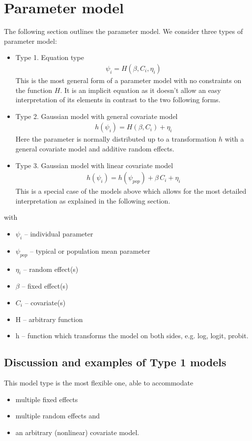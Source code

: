 \section{Parameter model}
\label{sec:parameterModel}
\label{maths:parameter_defn}
\label{maths:parameter-model}

The following section outlines the parameter model. We consider three types of parameter model:
\begin{itemize}
\item
Type 1. Equation type
\begin{align*}
\psi_i = H(\beta, C_i, \eta_i)
\end{align*}
This is the most general form of a parameter model with no constraints on the function $H$.
It is an implicit equation as it doesn't allow an easy interpretation of its elements in contrast to the two following forms.
\item
Type 2. Gaussian model with general covariate model
\begin{align*}
h(\psi_i) = H(\beta, C_i) + \eta_i
\end{align*}
Here the parameter is normally distributed up to a transformation $h$ with a general covariate model and additive random effects.
\item
Type 3. Gaussian model with linear covariate model
\begin{align*}
h(\psi_i) = h(\psi_{pop}) + \beta \, C_i + \eta_i
\end{align*}
This is a special case of the models above which allows for the most detailed interpretation as explained in the following section.
\end{itemize}
with
\begin{itemize}
\item
$\psi_i$ -- individual parameter
\item
$\psi_{pop}$ -- typical or population mean parameter
\item
$\eta_i$ -- random effect(s)
\item
$\beta$ -- fixed effect(s)
\item
$C_i$ -- covariate(s)
\item
H -- arbitrary function
\item
h -- function which transforms the model on both sides, e.g. log, logit, probit.
\end{itemize}

\subsection{Discussion and examples of Type 1 models}
\label{subsec:paramModelType1}
This model type is the most flexible one, able to accommodate
\begin{itemize}
\item
multiple fixed effects
\item
multiple random effects and
\item
an arbitrary (nonlinear) covariate model.
\end{itemize}

